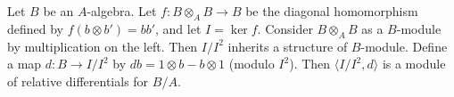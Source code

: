 Let $B$ be an $A$-algebra. Let $f: B \otimes_A B \rightarrow B$ be the diagonal homomorphism defined by $f(b \otimes b') = bb'$, and let $I = \ker f$. Consider $B \otimes_A B$ as a $B$-module by multiplication on the left. Then $I/I^2$ inherits a structure of $B$-module. Define a map $d: B \rightarrow I/I^2$ by $db = 1 \otimes b - b \otimes 1$ (modulo $I^2$). Then $\langle I/I^2, d \rangle$ is a module of relative differentials for $B/A$.
